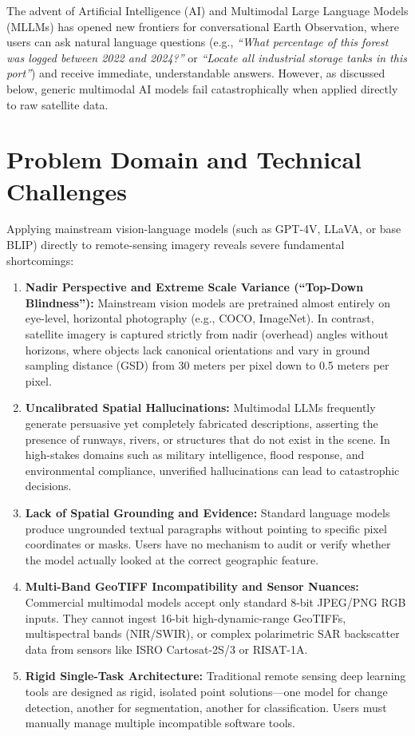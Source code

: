 \documentclass[12pt,a4paper]{report}
\begin{document}
The advent of Artificial Intelligence (AI) and Multimodal Large Language Models (MLLMs) has opened new frontiers for conversational Earth Observation, where users can ask natural language questions (e.g., \textit{``What percentage of this forest was logged between 2022 and 2024?''} or \textit{``Locate all industrial storage tanks in this port''}) and receive immediate, understandable answers. However, as discussed below, generic multimodal AI models fail catastrophically when applied directly to raw satellite data.

\section{Problem Domain and Technical Challenges}
Applying mainstream vision-language models (such as GPT-4V, LLaVA, or base BLIP) directly to remote-sensing imagery reveals severe fundamental shortcomings:

\begin{enumerate}[label=(\alph*)]
    \item \textbf{Nadir Perspective and Extreme Scale Variance (``Top-Down Blindness''):} Mainstream vision models are pretrained almost entirely on eye-level, horizontal photography (e.g., COCO, ImageNet). In contrast, satellite imagery is captured strictly from nadir (overhead) angles without horizons, where objects lack canonical orientations and vary in ground sampling distance (GSD) from 30 meters per pixel down to 0.5 meters per pixel.
    \item \textbf{Uncalibrated Spatial Hallucinations:} Multimodal LLMs frequently generate persuasive yet completely fabricated descriptions, asserting the presence of runways, rivers, or structures that do not exist in the scene. In high-stakes domains such as military intelligence, flood response, and environmental compliance, unverified hallucinations can lead to catastrophic decisions.
    \item \textbf{Lack of Spatial Grounding and Evidence:} Standard language models produce ungrounded textual paragraphs without pointing to specific pixel coordinates or masks. Users have no mechanism to audit or verify whether the model actually looked at the correct geographic feature.
    \item \textbf{Multi-Band GeoTIFF Incompatibility and Sensor Nuances:} Commercial multimodal models accept only standard 8-bit JPEG/PNG RGB inputs. They cannot ingest 16-bit high-dynamic-range GeoTIFFs, multispectral bands (NIR/SWIR), or complex polarimetric SAR backscatter data from sensors like ISRO Cartosat-2S/3 or RISAT-1A.
    \item \textbf{Rigid Single-Task Architecture:} Traditional remote sensing deep learning tools are designed as rigid, isolated point solutions---one model for change detection, another for segmentation, another for classification. Users must manually manage multiple incompatible software tools.
\end{enumerate}
\end{document}

